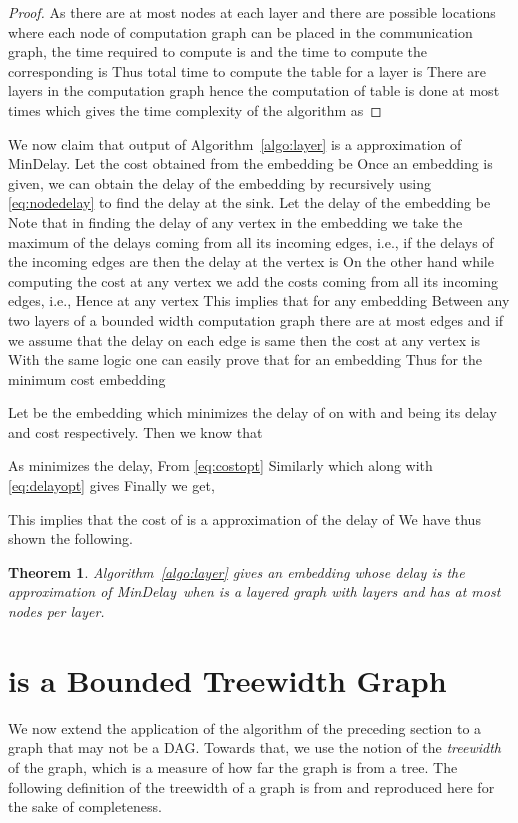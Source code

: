 \documentclass[journal]{IEEEtran}
\newtheorem{theorem}{{\bf Theorem}}
\newcommand{\mindelay}{\textsf{MinDelay}}
\begin{document}
\begin{proof}
  As there are at most  nodes at each layer and there are 
  possible locations where each node of computation graph can be
  placed in the communication graph, the time required to compute
   is  and the time to compute the
  corresponding  is  Thus total time to compute the
  table  for a layer is  There are  layers
  in the computation graph hence the computation of  table is
  done at most  times which gives the time complexity of the
  algorithm as 
\end{proof}


We now claim that output of Algorithm~\ref{algo:layer} is a 
approximation of \mindelay. Let the cost obtained from the embedding
 be  Once an embedding is given, we
can obtain the delay of the embedding by recursively using
\eqref{eq:nodedelay} to find the delay at the sink. Let the delay of
the embedding  be  Note that in
finding the delay of any vertex in the embedding we take the maximum
of the delays coming from all its incoming edges, i.e., if the delays
of the incoming edges are  then the delay at the
vertex is  On the other hand while
computing the cost at any vertex we add the costs coming from all its
incoming edges, i.e.,  Hence at any vertex  This implies that for any embedding  
Between any two layers of a bounded width computation graph there
are at most  edges and if we assume that the delay on each edge
is same then the cost at any vertex is  With the same logic
one can easily prove that for an embedding  
Thus for the minimum cost embedding 

Let  be the embedding which minimizes the delay of
 on  with  and  being its delay and cost respectively. Then we know that

As  minimizes the delay,  From \eqref{eq:costopt} 
Similarly  which along with
\eqref{eq:delayopt} gives 
Finally we get,

This implies that the cost of  is a 
approximation of the delay of  We have thus shown
the following. 
\begin{theorem}
  Algorithm~\ref{algo:layer} gives an embedding whose delay is the
   approximation of \mindelay\ when  is a layered
  graph with  layers and has at most  nodes per layer.
\end{theorem}

\section{ is a Bounded Treewidth Graph}
\label{sec:treewidth}

We now extend the application of the algorithm of the preceding
section to a graph that may not be a DAG. Towards that, we use the
notion of the \textit{treewidth} of the graph, which is a measure of
how far the graph is from a tree. The following definition of the
treewidth of a graph is from \cite{Diestel00} and reproduced here for
the sake of completeness.
\end{document}
